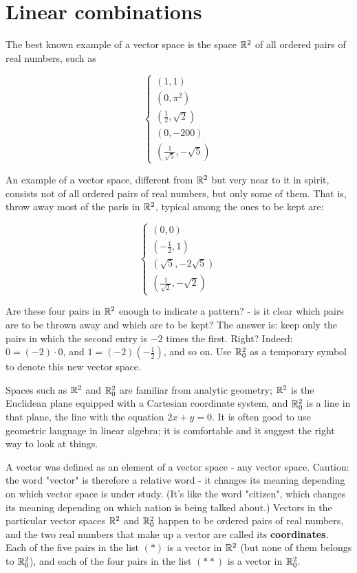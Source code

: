 \section{Linear combinations}

The best known example of a vector space is the space $\mathbb{R}^2$ of all ordered pairs of real numbers, such as

\[
    \begin{cases}
        (1,1)                   \\
        (0, \pi^2)              \\
        (\frac{1}{2}, \sqrt{2}) \\
        (0, -200)               \\
        (\frac{1}{\sqrt{5}}, -\sqrt{5})
    \end{cases} \tag{$\ast$}
\]

An example of a vector space, different from $\mathbb{R}^2$ but very near to it in spirit, consists not of all ordered pairs of real numbers, but only some of them. That is, throw away most of the paris in $\mathbb{R}^2$, typical among the ones to be kept are:

\[
    \begin{cases}
        (0,0)                  \\
        (-\frac{1}{2},1)       \\
        (\sqrt{5}, -2\sqrt{5}) \\
        (\frac{1}{\sqrt{2}}, -\sqrt{2})
    \end{cases} \tag{$\ast\ast$}
\]

Are these four pairs in $\mathbb{R}^2$ enough to indicate a pattern? - is it clear which pairs are to be thrown away and which are to be kept? The answer is: keep only the pairs in which the second entry is $-2$ times the first. Right? Indeed: $0 = (-2) \cdot 0$, and $1 = (-2) (- \frac{1}{2})$, and so on. Use $\mathbb{R}^2_0$ as a temporary symbol to denote this new vector space.

Spaces such as $\mathbb{R}^2$ and $\mathbb{R}^2_0$ are familiar from analytic geometry; $\mathbb{R}^2$ is the Euclidean plane equipped with a Cartesian coordinate system, and $\mathbb{R}^2_0$ is a line in that plane, the line with the equation $2x + y = 0$. It is often good to use geometric language in linear algebra; it is comfortable and it suggest the right way to look at things.

A vector was defined as an element of a vector space - any vector space. Caution: the word "vector" is therefore a relative word - it changes its meaning depending on which vector space is under study. (It's like the word "citizen", which changes its meaning depending on which nation is being talked about.) Vectors in the particular vector spaces $\mathbb{R}^2$ and $\mathbb{R}^2_0$ happen to be ordered pairs of real numbers, and the two real numbers that make up a vector are called its \textbf{coordinates}. Each of the five pairs in the list $(\ast)$ is a vector in $\mathbb{R}^2$ (but none of them belongs to $\mathbb{R}^2_0$), and each of the four pairs in the list $(\ast\ast)$ is a vector in $\mathbb{R}^2_0$.

